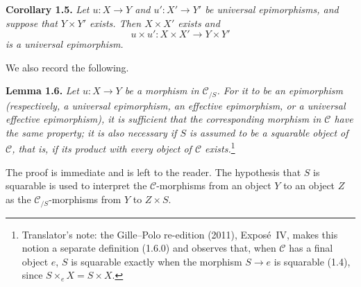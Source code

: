 \medskip
\noindent{}\textbf{Corollary 1.5.}
\textit{Let \(u:X\to Y\) and \(u':X'\to Y'\) be universal epimorphisms,
and suppose that \(Y\times Y'\) exists. Then \(X\times X'\) exists and}
\[
  u\times u':X\times X'\longrightarrow Y\times Y'
\]
\textit{is a universal epimorphism.}

We also record the following.

\medskip
\noindent{}\textbf{Lemma 1.6.}
\textit{Let \(u:X\to Y\) be a morphism in \(\mathscr C_{/S}\). For it to be
an epimorphism (respectively, a universal epimorphism, an effective
epimorphism, or a universal effective epimorphism), it is sufficient that the
corresponding morphism in \(\mathscr C\) have the same property; it is also
necessary if \(S\) is assumed to be a squarable object of \(\mathscr C\),
that is, if its product with every object of \(\mathscr C\) exists.}\footnote{Translator's note: the Gille--Polo re-edition (2011), Expos\'e~IV, makes this
notion a separate definition (1.6.0) and observes that, when \(\mathscr C\)
has a final object \(e\), \(S\) is squarable exactly when the morphism
\(S\to e\) is squarable (1.4), since \(S\times_eX=S\times X\).}

The proof is immediate and is left to the reader. The hypothesis that \(S\)
is squarable is used to interpret the \(\mathscr C\)-morphisms from an object
\(Y\) to an object \(Z\) as the
\(\mathscr C_{/S}\)-morphisms from \(Y\) to \(Z\times S\).
